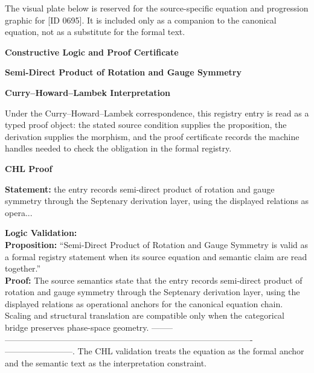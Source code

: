 \begingroup\footnotesize\sloppy
The visual plate below is reserved for the source-specific equation and progression graphic for [ID 0695]. It is included only as a companion to the canonical equation, not as a substitute for the formal text.
\par\endgroup
\ifTZPDarkEdition
{}
\fi

\clearpage
\begingroup\tzpsupportsetup
\noindent\textbf{\fontsize{10.8pt}{12.8pt}\selectfont [ID 0695] Constructive Logic and Proof Certificate}\par
\noindent\textbf{\fontsize{10pt}{12pt}\selectfont Semi-Direct Product of Rotation and Gauge Symmetry}\par
\vspace{0.45em}
\begingroup
\footnotesize
\setlength{\parskip}{0.22em}
\setlength{\parindent}{0pt}
\noindent\textbf{Curry--Howard--Lambek Interpretation}\par
Under the Curry--Howard--Lambek correspondence, this registry entry is read as a typed proof
object: the stated source condition supplies the proposition, the derivation supplies the
morphism, and the proof certificate records the machine handles needed to check the obligation
in the formal registry.

\vspace{0.45em}
\noindent\textbf{CHL Proof}\par
\textbf{Statement:} the entry records semi-direct product of rotation and gauge symmetry through the
Septenary derivation layer, using the displayed relations as opera...

\textbf{Logic Validation:}\\
\textbf{Proposition:} ``Semi-Direct Product of Rotation and Gauge Symmetry is valid as a formal registry
statement when its source equation and semantic claim are read together.''\\
\textbf{Proof:} The source semantics state that the entry records semi-direct product of rotation and
gauge symmetry through the Septenary derivation layer, using the displayed relations as
operational anchors for the canonical equation chain. Scaling and structural translation
are compatible only when the categorical bridge preserves phase-space geometry. --------
----------------------------------------------------------------------------------------
------------------------. The CHL validation treats the equation as the formal anchor
and the semantic text as the interpretation constraint.

